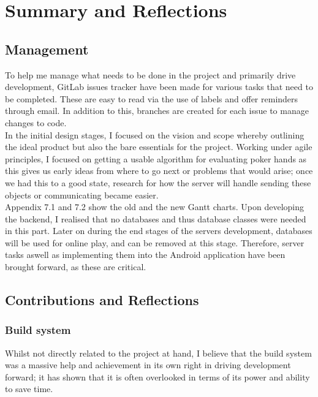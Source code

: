 \documentclass[11pt]{article}
\begin{document}
\section{Summary and Reflections}
\subsection{Management}
To help me manage what needs to be done in the project and primarily drive development, GitLab issues tracker have been made for various tasks that need to be completed. These are easy to read via the use of labels and offer reminders through email. In addition to this, branches are created for each issue to manage changes to code. \\

In the initial design stages, I focused on the vision and scope whereby outlining the ideal product but also the bare essentials for the project. Working under agile principles, I focused on getting a usable algorithm for evaluating poker hands as this gives us early ideas from where to go next or problems that would arise; once we had this to a good state, research for how the server will handle sending these objects or communicating became easier.  \\

Appendix 7.1 and 7.2 show the old and the new Gantt charts. Upon developing the backend, I realised that no databases and thus database classes were needed in this part. Later on during the end stages of the servers development, databases will be used for online play, and can be removed at this stage. Therefore, server tasks aswell as implementing them into the Android application have been brought forward, as these are critical.  \\

\subsection{Contributions and Reflections}

\subsubsection*{Build system}
Whilst not directly related to the project at hand, I believe that the build system was a massive help and achievement in its own right in driving development forward; it has shown that it is often overlooked in terms of its power and ability to save time. \\
\end{document}
